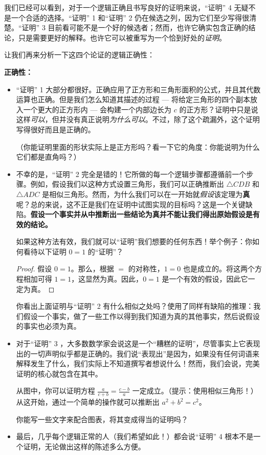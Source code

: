 我们已经可以看到，对于一个逻辑正确且书写良好的证明来说，``证明'' 4 无疑不是一个合适的选择。``证明'' 1 和``证明'' 2 仍在候选之列，因为它们至少写得很清楚。``证明'' 3 目前看可能不是一个好的候选者；然而，也许它确实包含正确的结论，只是需要更好的解释。也许它可以被重写为一个恰到好处的\emph{证明}。

让我们再来分析一下这四个论证的逻辑正确性：

\textbf{正确性：}

\begin{itemize}
    \item ``证明'' 1 大部分都很好。正确应用了正方形和三角形面积的公式，并且其代数运算也正确。但是我们怎么知道其描述的过程 --- 将给定三角形的四个副本放入一个更大的正方形内 --- 会构建一个内部边长为 $c$ 的正方形？证明中只是说这样\emph{可以}，但并没有真正说明\emph{为什么可以}。不过，除了这个疏漏外，这个证明写得很好而且是正确的。
    
    （你能证明里面的形状实际上是正方形吗？看一下它的角度：你能说明为什么它们都是直角吗？）
    \item 不幸的是，``证明'' 2 完全是错的！它所做的每一个逻辑步骤都遵循前一个步骤。例如，假设我们以这种方式设置三角形，我们可以正确推断出 $\triangle CDB$ 和 $\triangle ADC$ 是相似三角形。然而，为什么我们可以在一开始就\emph{假设}该定理为\textbf{真}呢？总的来说，这不正是我们在证明中试图实现的目标吗？这是一个关键缺陷。\textbf{假设一个事实并从中推断出一些结论为真并不能让我们得出原始假设是有效的结论。}
    
    如果这种方法有效，我们就可以``证明''我们想要的任何东西！举个例子：你如何看待以下证明 $0 = 1$ 的``证明''？
    \begin{proof}
        假设 $0 = 1$。那么，根据 $=$ 的对称性，$1 = 0$ 也是成立的。将这两个方程相加可得 $1 = 1$，这显然为真。因此，$0 = 1$ 是一个有效的假设，因此它一定为真。
    \end{proof}
    你看出上面证明与``证明'' 2 有什么相似之处吗？使用了同样有缺陷的推理：我们假设一个事实，做了一些工作以得到我们知道为真的其他事实，然后说假设的事实也必须为真。
    \item 对于``证明'' 3 ，大多数数学家会说这是一个``糟糕的证明''，尽管事实上它表现出的一切声明似乎都是正确的。我们说``表现出''是因为，如果没有任何词语来解释发生了什么，我们实际上不知道撰写者想说什么！然而，我们会说，完美证明的核心就包含在其中。
    
    从图中，你可以证明方程 $\frac{a}{c+b} = \frac{c-b}{a}$ 一定成立。（提示：使用相似三角形！）从这开始，通过一个简单的操作就可以推断出 $a^2 + b^2 = c^2$。

    你能写一些文字来配合图表，将其变成得当的证明吗？
    \item 最后，几乎每个逻辑正常的人（我们希望如此！）都会说``证明'' 4 根本不是一个证明，无论做出这样的陈述多么方便。
\end{itemize}

